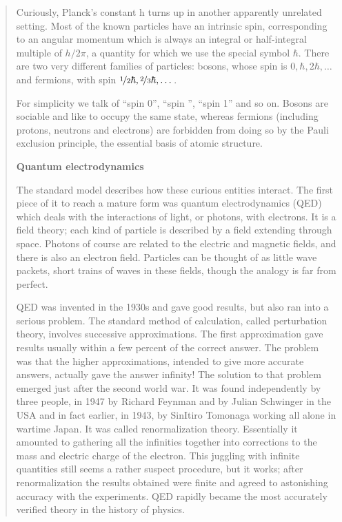 \begin{quote}
Curiously, Planck’s constant h turns up in another apparently unrelated setting. Most of the known particles have an intrinsic spin, corresponding to an angular momentum which is always an integral or half-integral multiple of $h/2\pi$, a quantity for which we use the special symbol $\hbar$. There are two very different families of particles: bosons, whose spin is $0,\hbar,2\hbar,\dots$ and fermions, with spin $\nicefrac{1}{2}\hbar, \nicefrac{2}{3}\hbar,\dots$.

For simplicity we talk of “spin 0”, “spin ”, “spin 1” and so on. Bosons are sociable and like to occupy the same state, whereas fermions (including protons, neutrons and electrons) are forbidden from doing so by the Pauli exclusion principle, the essential basis of atomic structure.

\textbf{Quantum electrodynamics}

The standard model describes how these curious entities interact. The first piece of it to reach a mature form was quantum electrodynamics (QED) which deals with the interactions of light, or photons, with electrons. It is a field theory; each kind of particle is described by a field extending through space. Photons of course are related to the electric and magnetic fields, and there is also an electron field. Particles can be thought of as little wave packets, short trains of waves in these fields, though the analogy is far from perfect.

QED was invented in the 1930s and gave good results, but also ran into a serious problem. The standard method of calculation, called perturbation theory, involves successive approximations. The first approximation gave results usually within a few percent of the correct answer. The problem was that the higher approximations, intended to give more accurate answers, actually gave the answer infinity! The solution to that problem emerged just after the second world war. It was found independently by three people, in 1947 by Richard Feynman and by Julian Schwinger in the USA and in fact earlier, in 1943, by SinItiro Tomonaga working all alone in wartime Japan. It was called renormalization theory. Essentially it amounted to gathering all the infinities together into corrections to the mass and electric charge of the electron. This juggling with infinite quantities still seems a rather suspect procedure, but it works; after renormalization the results obtained were finite and agreed to astonishing accuracy with the experiments. QED rapidly became the most accurately verified theory in the history of physics.


\end{quote}
